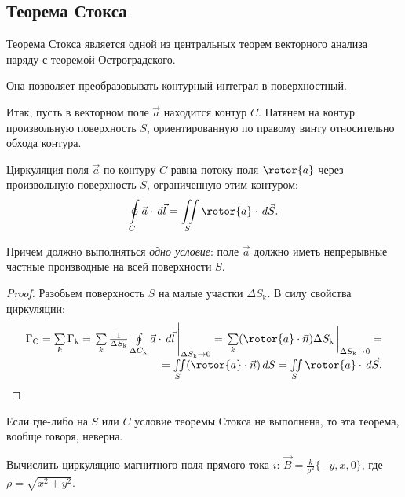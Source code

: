 \subsection{Теорема Стокса}

	Теорема Стокса является одной из центральных теорем векторного анализа наряду с теоремой Остроградского.
	
	Она позволяет преобразовывать контурный интеграл в поверхностный.
	
	Итак, пусть в векторном поле \( \vec{a} \) находится контур \( C \). Натянем на контур произвольную поверхность \( S \), ориентированную по правому винту относительно обхода контура.
	
	\begin{theorem}
	Циркуляция поля \( \vec{a} \) по контуру \( C \) равна потоку поля \( \rotor{a} \) через произвольную поверхность \( S \),  ограниченную этим контуром:
	\[ \oint\limits_C \vec{a}\cdot\,d\vec{l} = \iint\limits_S \rotor{a}\cdot\,d\vec{S}. \]
	\end{theorem}	
	Причем должно выполняться \textit{одно условие}: поле \( \vec{a} \) должно иметь непрерывные частные производные на всей поверхности \( S \).
	
	\begin{proof}
	
	Разобьем поверхность \( S \) на малые участки \( \Delta S_\mathrm{k} \). В силу свойства циркуляции:
	\[ \begin{array}{r}
	\Gamma_\mathrm{C} = \sum\limits_k \Gamma_\mathrm{k} = \left.\sum\limits_k \frac{1}{\Delta S_\mathrm{k}} \oint\limits_{\Delta C_\mathrm{k}} \vec{a}\cdot\,d\vec{l}\,\right|_{\Delta S_\mathrm{k}\to0} = \left.\sum\limits_k (\rotor{a}\cdot\vec{n})\Delta S_\mathrm{k}\,\right|_{\Delta S_\mathrm{k}\to0} = \\[0.2cm]
	= \iint\limits_S (\rotor{a}\cdot\vec{n})\,d S = \iint\limits_S \rotor{a}\cdot\,d\vec{S}. \end{array} \]
	\end{proof}
	
	Если где-либо на \( S \) или \( C \) условие теоремы Стокса не выполнена, то эта теорема, вообще говоря, неверна.
	
	\begin{example}
	Вычислить циркуляцию магнитного поля прямого тока \( i \): \( \vec{B} = \frac{k}{\rho^2}\{ -y, x, 0 \} \), где \( \rho = \sqrt{x^2 + y^2} \).
	\end{example}
	
